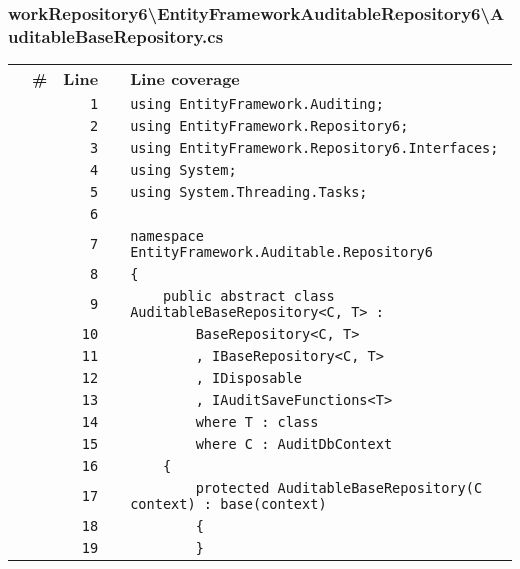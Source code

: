 \documentclass[a4paper,10pt]{article}
\begin{document}
\subsubsection{workRepository6\textbackslash EntityFrameworkAuditableRepository6\textbackslash AuditableBaseRepository.cs}
\begin{longtable}[l]{lrrll}
\textbf{} & \textbf{\#} & \textbf{Line} & \textbf{} & \textbf{Line coverage}\\
\cellcolor{gray} &  & \verb~1~ & & \verb~using EntityFramework.Auditing;~\\
\cellcolor{gray} &  & \verb~2~ & & \verb~using EntityFramework.Repository6;~\\
\cellcolor{gray} &  & \verb~3~ & & \verb~using EntityFramework.Repository6.Interfaces;~\\
\cellcolor{gray} &  & \verb~4~ & & \verb~using System;~\\
\cellcolor{gray} &  & \verb~5~ & & \verb~using System.Threading.Tasks;~\\
\cellcolor{gray} &  & \verb~6~ & & \verb~~\\
\cellcolor{gray} &  & \verb~7~ & & \verb~namespace EntityFramework.Auditable.Repository6~\\
\cellcolor{gray} &  & \verb~8~ & & \verb~{~\\
\cellcolor{gray} &  & \verb~9~ & & \verb~    public abstract class AuditableBaseRepository<C, T> :~\\
\cellcolor{gray} &  & \verb~10~ & & \verb~        BaseRepository<C, T>~\\
\cellcolor{gray} &  & \verb~11~ & & \verb~        , IBaseRepository<C, T>~\\
\cellcolor{gray} &  & \verb~12~ & & \verb~        , IDisposable~\\
\cellcolor{gray} &  & \verb~13~ & & \verb~        , IAuditSaveFunctions<T>~\\
\cellcolor{gray} &  & \verb~14~ & & \verb~        where T : class~\\
\cellcolor{gray} &  & \verb~15~ & & \verb~        where C : AuditDbContext~\\
\cellcolor{gray} &  & \verb~16~ & & \verb~    {~\\
\cellcolor{gray} &  & \verb~17~ & & \verb~        protected AuditableBaseRepository(C context) : base(context)~\\
\cellcolor{gray} &  & \verb~18~ & & \verb~        {~\\
\cellcolor{gray} &  & \verb~19~ & & \verb~        }~\\

\end{longtable}
\end{document}
